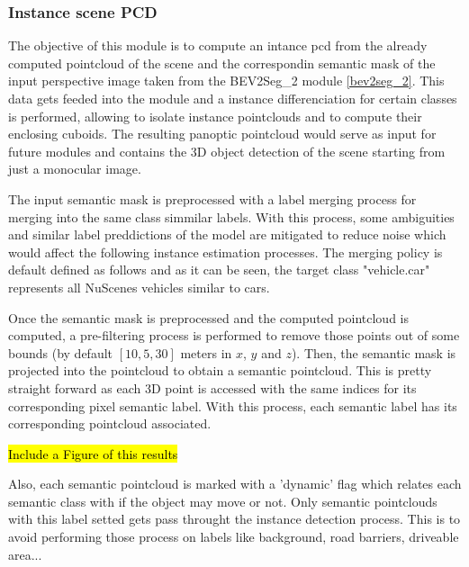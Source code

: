 \subsubsection{Instance scene PCD}
The objective of this module is to compute an intance pcd from the already computed pointcloud of the scene and the correspondin semantic mask of the input perspective image taken from the BEV2Seg\_2 module \ref{bev2seg_2}. This data gets feeded into the module and a instance differenciation for certain classes is performed, allowing to isolate instance pointclouds and to compute their enclosing cuboids. The resulting panoptic pointcloud would serve as input for future modules and contains the 3D object detection of the scene starting from just a monocular image.

The input semantic mask is preprocessed with a label merging process for merging into the same class simmilar labels. With this process, some ambiguities and similar label preddictions of the model are mitigated to reduce noise which would affect the following instance estimation processes. The merging policy is default defined as follows and as it can be seen, the target class "vehicle.car" represents all NuScenes vehicles similar to cars.


Once the semantic mask is preprocessed and the computed pointcloud is computed, a pre-filtering process is performed to remove those points out of some bounds (by default $\left[10, 5, 30\right]$ meters in $x$, $y$ and $z$). Then, the semantic mask is projected into the pointcloud to obtain a semantic pointcloud. This is pretty straight forward as each 3D point is accessed with the same indices for its corresponding pixel semantic label. With this process, each semantic label has its corresponding pointcloud associated.

\hl{Include a Figure of this results}

Also, each semantic pointcloud is marked with a 'dynamic' flag which relates each semantic class with if the object may move or not. Only semantic pointclouds with this label setted gets pass throught the instance detection process. This is to avoid performing those process on labels like background, road barriers, driveable area...

